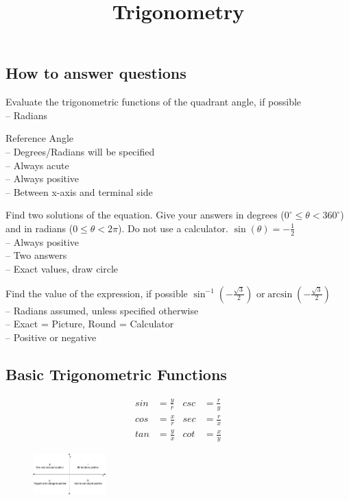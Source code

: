 \documentclass[twocolumn]{article}
\title{\vspace{-5ex}Trigonometry \vspace{-5ex}}
\author{}
\date{}
\begin{document}
	\maketitle{}
	
	\subsection*{How to answer questions}
	
	Evaluate the trigonometric functions of the quadrant angle, if possible \\
	\indent -- Radians
	
	\noindent Reference Angle \\
	\indent -- Degrees/Radians will be specified \\
	\indent -- Always acute \\
	\indent -- Always positive \\
	\indent -- Between x-axis and terminal side
	
	\noindent Find two solutions of the equation. Give your answers in degrees ($ 0^\circ \le \theta < 360^\circ $) and in radians ($ 0 \le \theta < 2\pi $). Do not use a calculator. $ \sin(\theta) = -\frac{1}{2} $ \\
	\indent -- Always positive \\
	\indent -- Two answers \\
	\indent -- Exact values, draw circle
	
	\noindent Find the value of the expression, if possible $ \sin^{-1}(-\frac{\sqrt{3}}{2}) \text{ or}  \arcsin(-\frac{\sqrt{3}}{2}) $ \\
    \indent -- Radians assumed, unless specified otherwise \\
	\indent -- Exact = Picture, Round = Calculator \\
	\indent -- Positive or negative
	
	\subsection*{Basic Trigonometric Functions}
	\begin{align*}
		sin &= \frac{y}{r}  & csc &= \frac{r}{y} \\
		cos &= \frac{x}{r} & sec &= \frac{r}{x} \\
		tan &= \frac{y}{x} & cot &= \frac{x}{y}
	\end{align*}

	\begin{figure}[h]
		\centering
		\includegraphics[width=0.25\textwidth]{positive_quadrants.jpg}
	\end{figure}
\end{document}
